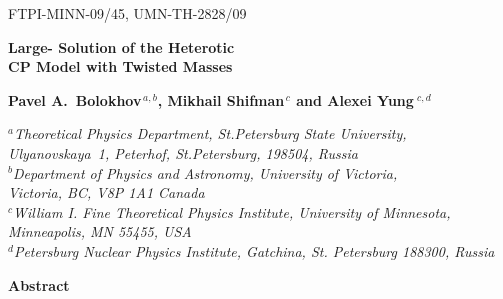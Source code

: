 \documentclass[epsfig,12pt]{article}
\begin{document}



\begin{titlepage}

\begin{flushright}
FTPI-MINN-09/45, UMN-TH-2828/09\\
\end{flushright}


\begin{center}
{  \Large \bf  Large- Solution of the Heterotic\\[2mm]
 CP Model with Twisted Masses}
\end{center}



\vspace{2mm}

\begin{center}

 {\large
 \bf   Pavel A.~Bolokhov$^{\,a,b}$,  Mikhail Shifman$^{\,c}$ and \bf Alexei Yung$^{\,\,c,d}$}
\end {center}

\begin{center}

$^a${\it Theoretical Physics Department, St.Petersburg State University, Ulyanovskaya~1, 
	 Peterhof, St.Petersburg, 198504, Russia}\\
$^b${\it Department of Physics and Astronomy, University of Victoria,\\
    Victoria, BC, V8P 1A1 Canada}\\
$^c${\it  William I. Fine Theoretical Physics Institute,
University of Minnesota,
Minneapolis, MN 55455, USA}\\
$^{d}${\it Petersburg Nuclear Physics Institute, Gatchina, St. Petersburg
188300, Russia
}
\end{center}


\begin{center}
{\large\bf Abstract}
\end{center}


\end{titlepage}
\end{document}
